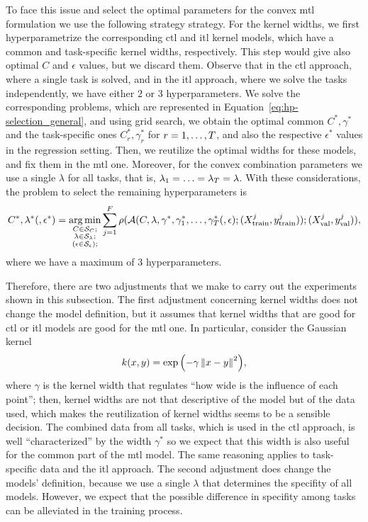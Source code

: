 To face this issue and select the optimal parameters for the convex \acrshort{mtl} formulation we use the following strategy strategy.
%
For the kernel widths, we first hyperparametrize the corresponding \acrshort{ctl} and \acrshort{itl} kernel models, which have a common and task-specific kernel widths, respectively. 
This step would give also optimal $C$ and $\epsilon$ values, but we discard them.
Observe that in the \acrshort{ctl} approach, where a single task is solved, and in the \acrshort{itl} approach, where we solve the tasks independently, we have either $2$ or $3$ hyperparameters. We solve the corresponding problems, which are represented in Equation~\eqref{eq:hp-selection_general}, and using grid search, we obtain the optimal common $C^*, \gamma^*$ and the task-specific ones $C_r^*, \gamma^*_r$ for $r=1, \ldots, T$, and also the respective $\epsilon^*$ values in the regression setting.
Then, we reutilize the optimal widths for these models, and fix them in the \acrshort{mtl} one. 
%
Moreover, for the convex combination parameters we use a single $\lambda$ for all tasks, that is, $\lambda_1 = \ldots = \lambda_T = \lambda$.
%
With these considerations, the problem to select the remaining hyperparameters is 
\begin{equation}
    \nonumber
    C^*, \lambda^* (, \epsilon^*) = \operatorname*{arg\min}_{\substack{C \in \mathcal{S}_C ; \\ \substack{\lambda \in \mathcal{S}_\lambda} ; \\ \left(\substack{\epsilon \in \mathcal{S}_\epsilon} \right); }}
     \sum_{j=1}^{F} \rho(\mathcal{A}(C, \lambda, \gamma^*, \gamma_1^*, \ldots, \gamma_T^* (, \epsilon); (X^j_\text{train}, y^j_\text{train})); (X^j_\text{val}, y^j_\text{val})) ,
\end{equation}
where we have a maximum of $3$ hyperparameters.

%
Therefore, there are two adjustments that we make to carry out the experiments shown in this subsection.
The first adjustment concerning kernel widths does not change the model definition, but it assumes that kernel widths that are good for \acrshort{ctl} or \acrshort{itl} models are good for the \acrshort{mtl} one. 
In particular, consider the Gaussian kernel
\begin{equation}
    \nonumber
    k(x, y) = \exp{\left(-\gamma \left\lVert x - y\right\rVert^2 \right)},
\end{equation}
where $\gamma$ is the kernel width that regulates ``how wide is the influence of each point'';
then, kernel widths are not that descriptive of the model but of the data used, which makes the reutilization of kernel widths seems to be a sensible decision.
The combined data from all tasks, which is used in the \acrshort{ctl} approach, is well ``characterized'' by the width $\gamma^*$ so we expect that this width is also useful for the common part of the \acrshort{mtl} model. The same reasoning applies to task-specific data and the \acrshort{itl} approach.
%
The second adjustment does change the models' definition, because we use a single $\lambda$ that determines the specifity of all models. However, we expect that the possible difference in specifity among tasks can be alleviated in the training process.

